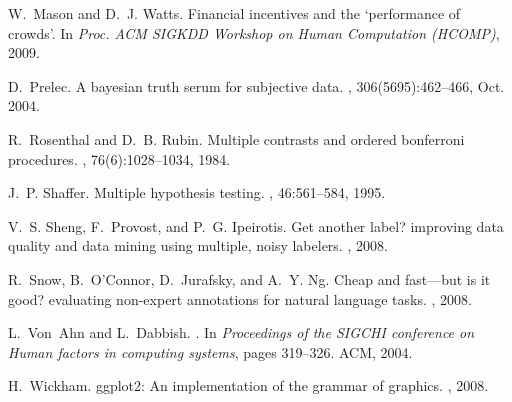 \documentclass{cscw2010}
\begin{document}
\begin{thebibliography}{10}
W.~Mason and D.~J. Watts.
\newblock Financial incentives and the `performance of crowds'.
\newblock In {\em Proc. ACM SIGKDD Workshop on Human Computation (HCOMP)},
  2009.

D.~Prelec.
\newblock A bayesian truth serum for subjective data.
, 306(5695):462--466, Oct. 2004.

R.~Rosenthal and D.~B. Rubin.
\newblock Multiple contrasts and ordered bonferroni procedures.
, 76(6):1028--1034, 1984.

J.~P. Shaffer.
\newblock Multiple hypothesis testing.
, 46:561--584, 1995.

V.~S. Sheng, F.~Provost, and P.~G. Ipeirotis.
\newblock Get another label? improving data quality and data mining using
  multiple, noisy labelers.
, 2008.

\newpage

R.~Snow, B.~O'Connor, D.~Jurafsky, and A.~Y. Ng.
\newblock Cheap and fast---but is it good? evaluating non-expert annotations
  for natural language tasks.
, 2008.

L.~Von~Ahn and L.~Dabbish.
.
\newblock In {\em Proceedings of the SIGCHI conference on Human factors in
  computing systems}, pages 319--326. ACM, 2004.

H.~Wickham.
\newblock ggplot2: An implementation of the grammar of graphics.
, 2008.

\end{thebibliography}
\end{document}
